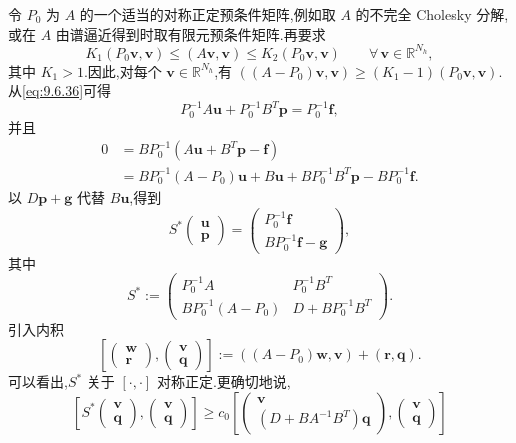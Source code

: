 令 \(P_0\) 为 \(A\) 的一个适当的对称正定预条件矩阵,例如取 \(A\) 的不完全 Cholesky 分解,或在 \(A\) 由谱逼近得到时取有限元预条件矩阵.再要求
\begin{equation}\label{eq:9.6.37}
  K_1(P_0\boldsymbol{v},\boldsymbol{v})\le(A\boldsymbol{v},\boldsymbol{v})
      \le K_2(P_0\boldsymbol{v},\boldsymbol{v})
        \qquad\forall\,\boldsymbol{v}\in\mathbb R^{N_h},
\end{equation}
其中 \(K_1>1\).因此,对每个 \(\boldsymbol{v}\in\mathbb R^{N_h}\),有 \(((A-P_0)\boldsymbol{v},\boldsymbol{v})\ge(K_1-1)(P_0\boldsymbol{v},\boldsymbol{v})\).从\eqref{eq:9.6.36}可得
\[
  P_0^{-1}A\boldsymbol{u}+P_0^{-1}B^T\boldsymbol{p}=P_0^{-1}\boldsymbol{f},
\]
并且
\[
  \begin{aligned}
    0&=BP_0^{-1}(A\boldsymbol{u}+B^T\boldsymbol{p}-\boldsymbol{f})\\
     &=BP_0^{-1}(A-P_0)\boldsymbol{u}
        +B\boldsymbol{u}+BP_0^{-1}B^T\boldsymbol{p}-BP_0^{-1}\boldsymbol{f}.
  \end{aligned}
\]
以 \(D\boldsymbol{p}+\boldsymbol{g}\) 代替 \(B\boldsymbol{u}\),得到
\begin{equation}\label{eq:9.6.38}
  S^*\begin{pmatrix}\boldsymbol{u}\\\boldsymbol{p}\end{pmatrix}
    =\begin{pmatrix}P_0^{-1}\boldsymbol{f}\\BP_0^{-1}\boldsymbol{f}-\boldsymbol{g}\end{pmatrix},
\end{equation}
其中
\[
  S^*:=\begin{pmatrix}
    P_0^{-1}A&P_0^{-1}B^T\\
    BP_0^{-1}(A-P_0)&D+BP_0^{-1}B^T
  \end{pmatrix}.
\]
引入内积
\[
  \left[\begin{pmatrix}\boldsymbol{w}\\\boldsymbol{r}\end{pmatrix},
        \begin{pmatrix}\boldsymbol{v}\\\boldsymbol{q}\end{pmatrix}\right]
    :=((A-P_0)\boldsymbol{w},\boldsymbol{v})+(\boldsymbol{r},\boldsymbol{q}).
\]
可以看出,\(S^*\) 关于 \([\cdot,\cdot]\) 对称正定.更确切地说,
\[
  \left[S^*\begin{pmatrix}\boldsymbol{v}\\\boldsymbol{q}\end{pmatrix},
        \begin{pmatrix}\boldsymbol{v}\\\boldsymbol{q}\end{pmatrix}\right]
   \ge c_0\left[\begin{pmatrix}\boldsymbol{v}\\(D+BA^{-1}B^T)\boldsymbol{q}\end{pmatrix},
        \begin{pmatrix}\boldsymbol{v}\\\boldsymbol{q}\end{pmatrix}\right]
\]
